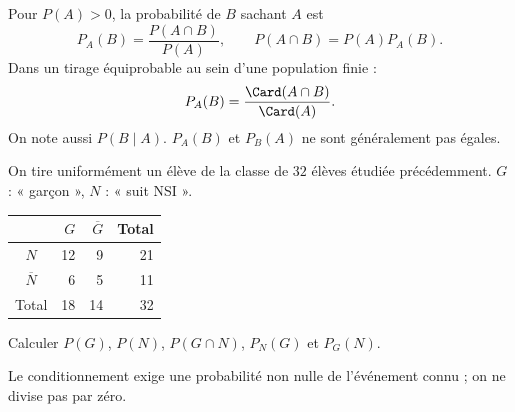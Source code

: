 \begin{keypoint}[Définition]
Pour $P(A)>0$, la probabilité de $B$ sachant $A$ est
\[P_A(B)=\frac{P(A\cap B)}{P(A)},\qquad P(A\cap B)=P(A)P_A(B).\]
Dans un tirage équiprobable au sein d'une population finie :
\[P_A(B)=\frac{\Card(A\cap B)}{\Card(A)}.\]
On note aussi $P(B\mid A)$. $P_A(B)$ et $P_B(A)$ ne sont généralement pas égales.
\end{keypoint}
\begin{example}On tire uniformément un élève de la classe de $32$ élèves étudiée précédemment. $G$ : « garçon », $N$ : « suit NSI ».\end{example}
\begin{center}\begin{tabular}{c|rr|r}
&$G$&$\overline G$&Total\\\hline
$N$&12&9&21\\$\overline N$&6&5&11\\\hline Total&18&14&32
\end{tabular}\end{center}
Calculer $P(G)$, $P(N)$, $P(G\cap N)$, $P_N(G)$ et $P_G(N)$.
\begin{pitfall}Le conditionnement exige une probabilité non nulle de l'événement connu ; on ne divise pas par zéro.\end{pitfall}

